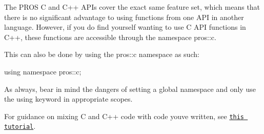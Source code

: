 The P\+R\+OS C and C++ A\+P\+Is cover the exact same feature set, which means that there is no significant advantage to using functions from one A\+PI in another language. However, if you do find yourself wanting to use C A\+PI functions in C++, these functions are accessible through the namespace {\ttfamily pros\+::c}.

This can also be done by using the {\ttfamily pros\+::c} namespace as such\+: \begin{DoxyVerb}using namespace pros::c;
\end{DoxyVerb}


As always, bear in mind the dangers of setting a global namespace and only use the {\ttfamily using} keyword in appropriate scopes.

For guidance on mixing C and C++ code with code you\textquotesingle{}ve written, see \href{https://isocpp.org/wiki/faq/mixing-c-and-cpp}{\tt this tutorial}. 